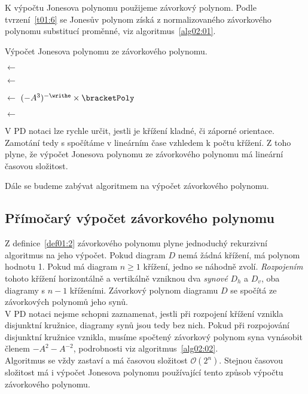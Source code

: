 K výpočtu Jonesova polynomu použijeme závorkový polynom. Podle tvrzení~\ref{t01:6} se Jonesův polynom získá z normalizovaného závorkového polynomu substitucí proměnné, viz algoritmus~\ref{alg02:01}.

\begin{algorithm}[h]

\caption{  Výpočet Jonesova polynomu ze závorkového polynomu.} 
{\label{alg02:01}}

\DontPrintSemicolon
{}



\BlankLine

\bracketPoly $\leftarrow$ \Bracket{\D}

\writhe $\leftarrow$ \Writhe{\D}

\normal $\leftarrow$ $ (-A^3)^{-\writhe} \times \bracketPoly$

\jones $\leftarrow$ 

\BlankLine

\KwRet \jones 



\end{algorithm}

V PD notaci lze rychle určit, jestli je křížení kladné, či záporné orientace. Zamotání tedy s spočítáme v lineárním čase vzhledem k počtu křížení. Z toho plyne, že výpočet Jonesova polynomu ze závorkového polynomu má lineární časovou složitost.

Dále se budeme zabývat algoritmem na výpočet závorkového polynomu. 

\subsection{Přímočarý výpočet závorkového polynomu}

Z definice~\ref{def01:2} závorkového polynomu plyne jednoduchý rekurzivní algoritmus na jeho výpočet. Pokud diagram $D$ nemá žádná křížení, má polynom hodnotu 1. Pokud má diagram $n\geq 1$ křížení, jedno se náhodně zvolí. \emph{Rozpojením} tohoto křížení horizontálně a vertikálně vzniknou dva \emph{synové} $D_h$ a $D_v$, oba diagramy s $n-1$ kříženími. Závorkový polynom diagramu $D$ se spočítá ze závorkových polynomů jeho synů.
\\
V PD notaci nejsme schopni zaznamenat, jestli při rozpojení křížení vznikla disjunktní kružnice, diagramy synů jsou tedy bez nich. Pokud při rozpojování disjunktní kružnice vznikla, musíme spočtený závorkový polynom syna vynásobit členem $-A^2 - A^{-2}$, podrobnosti viz algoritmus~\ref{alg02:02}.
\\
Algoritmus se vždy zastaví a má časovou složitost $\mathcal{O}(2^n)$. Stejnou časovou složitost má i výpočet Jonesova polynomu používající tento způsob výpočtu závorkového polynomu. 


